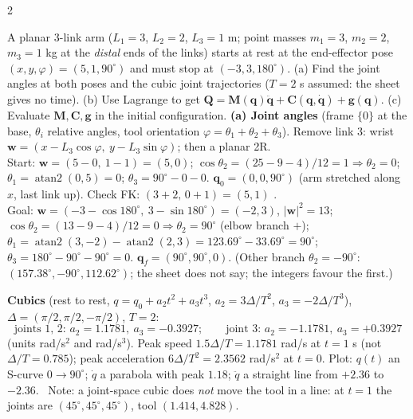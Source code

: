 \begin{multicols}{2}
\begin{examq}\label{w9:prac}
\begin{wnfig}\end{wnfig}
A planar 3-link arm ($L_1=3$, $L_2=2$, $L_3=1$ m; point masses $m_1=3$, $m_2=2$, $m_3=1$ kg at the \emph{distal} ends of the links) starts at rest at the end-effector pose $(x,y,\varphi)=(5,1,90^\circ)$ and must stop at $(-3,3,180^\circ)$. (a) Find the joint angles at both poses and the cubic joint trajectories ($T=2$ s assumed: the sheet gives no time). (b) Use Lagrange to get $\mathbf Q=\mathbf M(\mathbf q)\ddot{\mathbf q}+\mathbf C(\mathbf q,\dot{\mathbf q})+\mathbf g(\mathbf q)$. (c) Evaluate $\mathbf M,\mathbf C,\mathbf g$ in the initial configuration.
\solution
\textbf{(a) Joint angles} (frame $\{0\}$ at the base, $\theta_i$ relative angles, tool orientation $\varphi=\theta_1+\theta_2+\theta_3$). Remove link 3: wrist $\mathbf w=(x-L_3\cos\varphi,\ y-L_3\sin\varphi)$; then a planar 2R.\\
Start: $\mathbf w=(5-0,\ 1-1)=(5,0)$; $\cos\theta_2=(25-9-4)/12=1\Rightarrow\theta_2=0$; $\theta_1=\operatorname{atan2}(0,5)=0$; $\theta_3=90^\circ-0-0$. $\mathbf q_0=(0,0,90^\circ)$ (arm stretched along $x$, last link up). Check FK: $(3+2,\,0+1)=(5,1)$ \checkmark.\\
Goal: $\mathbf w=(-3-\cos180^\circ,\ 3-\sin180^\circ)=(-2,3)$, $|\mathbf w|^2=13$; $\cos\theta_2=(13-9-4)/12=0\Rightarrow\theta_2=90^\circ$ (elbow branch $+$); $\theta_1=\operatorname{atan2}(3,-2)-\operatorname{atan2}(2,3)=123.69^\circ-33.69^\circ=90^\circ$; $\theta_3=180^\circ-90^\circ-90^\circ=0$. $\mathbf q_f=(90^\circ,90^\circ,0)$. (Other branch $\theta_2=-90^\circ$: $(157.38^\circ,-90^\circ,112.62^\circ)$; the sheet does not say; the integers favour the first.) \chk\\
\end{examq}
\begin{examq}
\textbf{Cubics} (rest to rest, $q=q_0+a_2t^2+a_3t^3$, $a_2=3\Delta/T^2$, $a_3=-2\Delta/T^3$), $\Delta=(\pi/2,\pi/2,-\pi/2)$, $T=2$:
\[\text{joints 1, 2: }a_2=1.1781,\ a_3=-0.3927;\qquad \text{joint 3: }a_2=-1.1781,\ a_3=+0.3927\]
(units rad/s$^2$ and rad/s$^3$).
Peak speed $1.5\Delta/T=1.1781$ rad/s at $t=1$ s (not $\Delta/T=0.785$); peak acceleration $6\Delta/T^2=2.3562$ rad/s$^2$ at $t=0$. Plot: $q(t)$ an S-curve $0\to90^\circ$; $\dot q$ a parabola with peak $1.18$; $\ddot q$ a straight line from $+2.36$ to $-2.36$. \chk\ Note: a joint-space cubic does \emph{not} move the tool in a line: at $t=1$ the joints are $(45^\circ,45^\circ,45^\circ)$, tool $(1.414,4.828)$. \chk

\end{examq}
\end{multicols}
